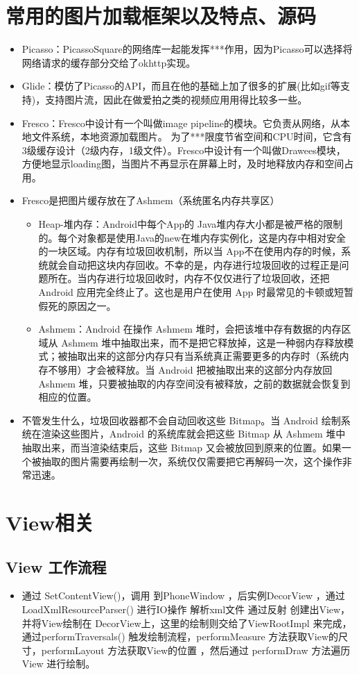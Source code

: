 \documentclass[9pt, b5paper]{article}
\begin{document}
\section{常用的图片加载框架以及特点、源码}
\label{sec-5}
\begin{itemize}
\item Picasso：PicassoSquare的网络库一起能发挥***作用，因为Picasso可以选择将网络请求的缓存部分交给了okhttp实现。
\item Glide：模仿了Picasso的API，而且在他的基础上加了很多的扩展(比如gif等支持)，支持图片流，因此在做爱拍之类的视频应用用得比较多一些。
\item Fresco：Fresco中设计有一个叫做image pipeline的模块。它负责从网络，从本地文件系统，本地资源加载图片。 为了***限度节省空间和CPU时间，它含有3级缓存设计（2级内存，1级文件）。Fresco中设计有一个叫做Drawees模块， 方便地显示loading图，当图片不再显示在屏幕上时，及时地释放内存和空间占用。
\item Fresco是把图片缓存放在了Ashmem（系统匿名内存共享区）
\begin{itemize}
\item Heap-堆内存：Android中每个App的 Java堆内存大小都是被严格的限制的。每个对象都是使用Java的new在堆内存实例化，这是内存中相对安全的一块区域。内存有垃圾回收机制，所以当 App不在使用内存的时候，系统就会自动把这块内存回收。不幸的是，内存进行垃圾回收的过程正是问题所在。当内存进行垃圾回收时，内存不仅仅进行了垃圾回收，还把 Android 应用完全终止了。这也是用户在使用 App 时最常见的卡顿或短暂假死的原因之一。
\item Ashmem：Android 在操作 Ashmem 堆时，会把该堆中存有数据的内存区域从 Ashmem 堆中抽取出来，而不是把它释放掉，这是一种弱内存释放模式；被抽取出来的这部分内存只有当系统真正需要更多的内存时（系统内存不够用）才会被释放。当 Android 把被抽取出来的这部分内存放回 Ashmem 堆，只要被抽取的内存空间没有被释放，之前的数据就会恢复到相应的位置。
\end{itemize}
\item 不管发生什么，垃圾回收器都不会自动回收这些 Bitmap。当 Android 绘制系统在渲染这些图片，Android 的系统库就会把这些 Bitmap 从 Ashmem 堆中抽取出来，而当渲染结束后，这些 Bitmap 又会被放回到原来的位置。如果一个被抽取的图片需要再绘制一次，系统仅仅需要把它再解码一次，这个操作非常迅速。
\end{itemize}
\section{View相关}
\label{sec-6}
\subsection{View 工作流程}
\label{sec-6-1}
\begin{itemize}
\item 通过 SetContentView()，调用 到PhoneWindow ，后实例DecorView ，通过 LoadXmlResourceParser() 进行IO操作 解析xml文件 通过反射 创建出View，并将View绘制在 DecorView上，这里的绘制则交给了ViewRootImpl 来完成，通过performTraversals() 触发绘制流程，performMeasure 方法获取View的尺寸，performLayout 方法获取View的位置 ，然后通过 performDraw 方法遍历View 进行绘制。
\end{itemize}
\end{document}
